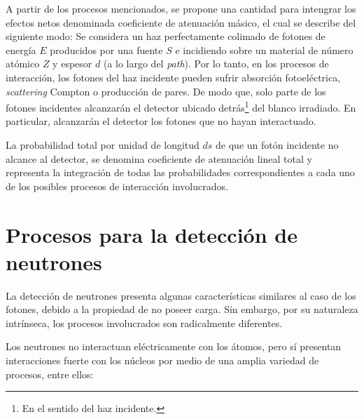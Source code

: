 %
A partir de los procesos mencionados, se propone una cantidad para intengrar los efectos netos denominada coeficiente de 
atenuaci\'on m\'asico, el cual se describe del siguiente modo: Se considera un haz perfectamente colimado de fotones de energ\'ia $E$
producidos por una fuente $S$ e incidiendo sobre un material de n\'umero at\'omico $Z$ y espesor $d$ (a lo largo del \textit{path}).
%
Por lo tanto, en los procesos de interacci\'on, los fotones del haz incidente pueden sufrir absorci\'on fotoel\'ectrica, \textit{scattering}
Compton o producci\'on de pares. De modo que, solo parte de los fotones incidentes alcanzar\'an el detector ubicado detr\'as\footnote{En 
el sentido del haz incidente.} del blanco irradiado. En particular, alcanzar\'an el detector los fotones que no hayan interactuado.
%

%
La probabilidad total por unidad de longitud $d s$ de que un fot\'on incidente no alcance al detector, se denomina coeficiente de 
atenuaci\'on lineal total y representa la integraci\'on de todas las probabilidades correspondientes a cada uno de los posibles procesos de
interacci\'on involucrados.


\section{Procesos para la detecci\'on de neutrones}
\label{CapIII_2}


La detecci\'on de neutrones presenta algunas caracter\'isticas similares al caso de los fotones, debido a la propiedad de no poseer carga. 
Sin embargo, por su naturaleza intr\'inseca, los procesos involucrados son radicalmente diferentes.
%

%
Los neutrones no interactuan el\'ectricamente con los \'atomos, pero s\'i presentan interacciones fuerte con los n\'ucleos por medio de
una amplia variedad de procesos, entre ellos:

